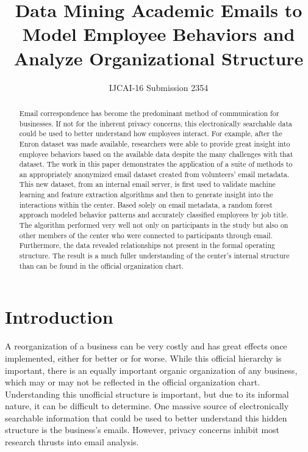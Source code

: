 \documentclass{article}
\begin{document}
\title{Data Mining Academic Emails to Model Employee Behaviors and Analyze Organizational Structure}
\author{IJCAI-16 Submission 2354}
\maketitle

\begin{abstract}
Email correspondence has become the predominant method of communication for businesses.  If not for the inherent privacy concerns, this electronically searchable data could be used to better understand how employees interact. For example, after the Enron dataset was made available, researchers were able to provide great insight into employee behaviors based on the available data despite the many challenges with that dataset.  The work in this paper demonstrates the application of a suite of methods to an appropriately anonymized email dataset created from volunteers' email metadata.  This new dataset, from an internal email server, is first used to validate machine learning and feature extraction algorithms and then to generate insight into the interactions within the center.  Based solely on email metadata, a random forest approach modeled behavior patterns and accurately classified employees by job title.  The algorithm performed very well not only on participants in the study but also on other members of the center who were connected to participants through email.  Furthermore, the data revealed relationships not present in the formal operating structure.  The result is a much fuller understanding of the center's internal structure than can be found in the official organization chart.
\end{abstract}

\section{Introduction}
A reorganization of a business can be very costly and has great effects once implemented, either for better or for worse.  While this official hierarchy is important, there is an equally important organic organization of any business, which may or may not be reflected in the official organization chart.  Understanding this unofficial structure is important, but due to its informal nature, it can be difficult to determine.  One massive source of electronically searchable information that could be used to better understand this hidden structure is the business's emails.  However, privacy concerns inhibit most research thrusts into email analysis.  
\end{document}
